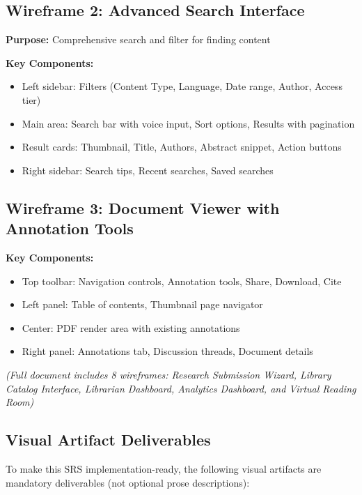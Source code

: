 \documentclass[12pt,a4paper]{report}
\begin{document}
\subsection{Wireframe 2: Advanced Search Interface}
\textbf{Purpose:} Comprehensive search and filter for finding content

\textbf{Key Components:}
\begin{itemize}
    \item Left sidebar: Filters (Content Type, Language, Date range, Author, Access tier)
    \item Main area: Search bar with voice input, Sort options, Results with pagination
    \item Result cards: Thumbnail, Title, Authors, Abstract snippet, Action buttons
    \item Right sidebar: Search tips, Recent searches, Saved searches
\end{itemize}

\subsection{Wireframe 3: Document Viewer with Annotation Tools}
\textbf{Key Components:}
\begin{itemize}
    \item Top toolbar: Navigation controls, Annotation tools, Share, Download, Cite
    \item Left panel: Table of contents, Thumbnail page navigator
    \item Center: PDF render area with existing annotations
    \item Right panel: Annotations tab, Discussion threads, Document details
\end{itemize}

\textit{(Full document includes 8 wireframes: Research Submission Wizard, Library Catalog Interface, Librarian Dashboard, Analytics Dashboard, and Virtual Reading Room)}

\subsection{Visual Artifact Deliverables}

To make this SRS implementation-ready, the following visual artifacts are mandatory deliverables (not optional prose descriptions):
\end{document}
